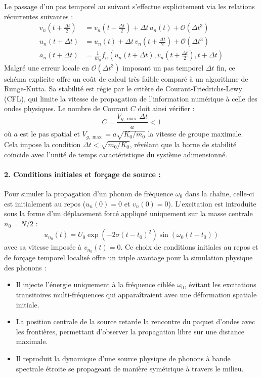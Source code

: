Le passage d'un pas temporel au suivant s'effectue explicitement via les relations récurrentes suivantes :
\begin{align*}
    v_n\left(t + \frac{\Delta t}{2}\right) &= v_n\left(t - \frac{\Delta t}{2}\right) + \Delta t \, a_n(t) + \mathcal{O}(\Delta t^3) \\
    u_n(t + \Delta t) &= u_n(t) + \Delta t \, v_n\left(t + \frac{\Delta t}{2}\right) + \mathcal{O}(\Delta t^3) \\
    a_n(t + \Delta t) &= \frac{1}{m_0} f_n\left(u_n(t + \Delta t), v_n\left(t + \frac{\Delta t}{2}\right), t + \Delta t\right)
\end{align*}
Malgré une erreur locale en $\mathcal{O}(\Delta t^3)$ imposant un pas temporel $\Delta t$ fin, ce schéma explicite offre un coût de calcul très faible comparé à un algorithme de Runge-Kutta. Sa stabilité est régie par le critère de Courant-Friedrichs-Lewy (CFL), qui limite la vitesse de propagation de l'information numérique à celle des ondes physiques. Le nombre de Courant $C$ doit ainsi vérifier :
\begin{equation*}
    C = \frac{V_{g,\max} \, \Delta t}{a} < 1
\end{equation*}
où $a$ est le pas spatial et $V_{g,\max} = a \sqrt{K_0/m_0}$ la vitesse de groupe maximale. Cela impose la condition $\Delta t < \sqrt{m_0/K_0}$, révélant que la borne de stabilité coïncide avec l'unité de temps caractéristique du système adimensionné.
\paragraph{2. Conditions initiales et forçage de source :}
Pour simuler la propagation d'un phonon de fréquence $\omega_0$ dans la chaîne, celle-ci est initialement au repos ($u_n(0) = 0$ et $v_n(0) = 0$). L'excitation est introduite sous la forme d'un déplacement forcé appliqué uniquement sur la masse centrale $n_0 = N/2$ :
\begin{equation*}
    u_{n_0}(t) = U_0 \exp\left( -2\sigma (t-t_0)^2 \right) \sin\left( \omega_0 (t - t_0) \right)
\end{equation*}
avec sa vitesse imposée à $v_{n_0}(t) = 0$. Ce choix de conditions initiales au repos et de forçage temporel localisé offre un triple avantage pour la simulation physique des phonons :
\begin{itemize}
    \item Il injecte l'énergie uniquement à la fréquence ciblée $\omega_0$, évitant les excitations transitoires multi-fréquences qui apparaîtraient avec une déformation spatiale initiale.
    \item La position centrale de la source retarde la rencontre du paquet d'ondes avec les frontières, permettant d'observer la propagation libre sur une distance maximale.
    \item Il reproduit la dynamique d'une source physique de phonons à bande spectrale étroite se propageant de manière symétrique à travers le milieu.
\end{itemize}

